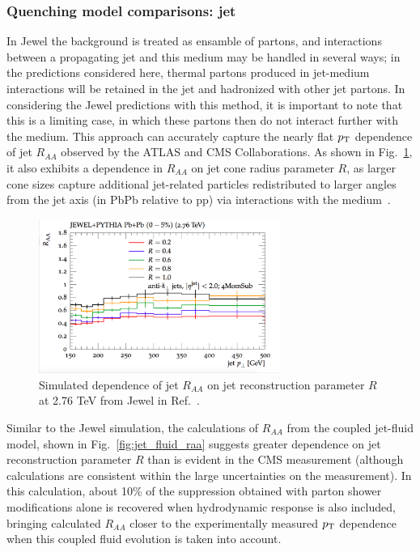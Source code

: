 \subsubsection{Quenching model comparisons: jet }
\label{sec:theory_jet_raa}

In {\sc Jewel} the background is treated as ensamble of partons, and interactions between a propagating jet and this medium may be handled in several ways; in the predictions considered here, thermal partons produced in jet-medium interactions will be retained in the jet and hadronized with other jet partons.  In considering the {\sc Jewel} predictions with this method, it is important to note that this is a limiting case, in which these partons then do not interact further with the medium.  This approach can accurately capture the nearly flat $p_{\rm T}$ dependence of jet $R_{AA}$ observed by the ATLAS and CMS Collaborations.  As shown in Fig.~\ref{fig:jewel_raa}, it also exhibits a dependence in $R_{AA}$ on jet cone radius parameter $R$, as larger cone sizes capture additional jet-related particles redistributed to larger angles from the jet axis (in PbPb relative to pp) via interactions with the medium~\cite{Elayavalli:2017hxo}.  

\begin{figure}[ht!]
\begin{center}
\includegraphics[width=0.7\textwidth]{figures/Models/JEWEL_Raa.png}
\caption[Simulated dependence of jet $R_{AA}$ on $R$ at 2.76 TeV from {\sc Jewel}]{Simulated dependence of jet $R_{AA}$ on jet reconstruction parameter $R$ at 2.76 TeV from {\sc Jewel} in Ref.~\cite{Elayavalli:2017hxo}.}
\label{fig:jewel_raa}
\end{center}
\end{figure}

Similar to the {\sc Jewel} simulation, the calculations of $R_{AA}$ from the coupled jet-fluid model, shown in Fig.~\ref{fig:jet_fluid_raa} suggests greater dependence on jet reconstruction parameter $R$ than is evident in the CMS measurement (although calculations are consistent within the large uncertainties on the measurement).  In this calculation, about 10\% of the suppression obtained with parton shower modifications alone is recovered when hydrodynamic response is also included, bringing calculated $R_{AA}$ closer to the experimentally measured $p_{\rm T}$ dependence when this coupled fluid evolution is taken into account.  

